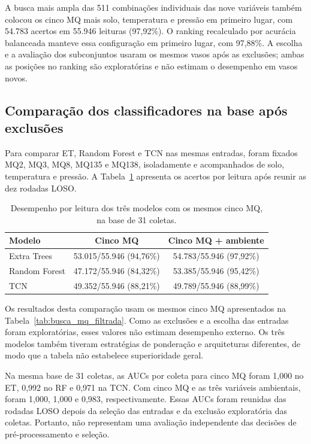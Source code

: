 A busca mais ampla das 511 combinações individuais das nove variáveis
também colocou os cinco MQ mais solo, temperatura e pressão em primeiro
lugar, com 54.783 acertos em 55.946 leituras (97,92\%). O ranking
recalculado por acurácia balanceada manteve essa configuração em primeiro
lugar, com 97,88\%. A escolha e a avaliação dos subconjuntos usaram os
mesmos vasos após as exclusões; ambas as posições no ranking são
exploratórias e não estimam o desempenho em vasos novos.

\subsection{Comparação dos classificadores na base após exclusões}
\label{subsec:resultados_modelos_loso_filtrado}

Para comparar ET, Random Forest e TCN nas mesmas entradas, foram fixados
MQ2, MQ3, MQ8, MQ135 e MQ138, isoladamente e acompanhados de solo,
temperatura e pressão. A Tabela~\ref{tab:modelos_cinco_mq_filtrado}
apresenta os acertos por leitura após reunir as dez rodadas LOSO.
\begin{table}[H]
    \centering
    \caption{Desempenho por leitura dos três modelos com os mesmos cinco MQ, na base de 31 coletas.}
    \label{tab:modelos_cinco_mq_filtrado}
    \begin{tabular}{lcc}
        \hline
        Modelo & Cinco MQ & Cinco MQ + ambiente \\
        \hline
        Extra Trees & 53.015/55.946 (94,76\%) & 54.783/55.946 (97,92\%) \\
        Random Forest & 47.172/55.946 (84,32\%) & 53.385/55.946 (95,42\%) \\
        TCN & 49.352/55.946 (88,21\%) & 49.789/55.946 (88,99\%) \\
        \hline
    \end{tabular}
\end{table}
Os resultados desta comparação usam os mesmos cinco MQ apresentados na
Tabela~\ref{tab:busca_mq_filtrada}. Como as exclusões e a escolha das entradas foram
exploratórias, esses valores não estimam desempenho externo. Os três
modelos também tiveram estratégias de ponderação e arquiteturas
diferentes, de modo que a tabela não estabelece superioridade geral.

Na mesma base de 31 coletas, as AUCs por coleta para cinco MQ foram
1,000 no ET, 0,992 no RF e 0,971 na TCN. Com cinco MQ e as três
variáveis ambientais, foram 1,000, 1,000 e 0,983, respectivamente.
Essas AUCs foram reunidas das rodadas LOSO depois da seleção das entradas
e da exclusão exploratória das coletas. Portanto, não representam uma
avaliação independente das decisões de pré-processamento e seleção.

